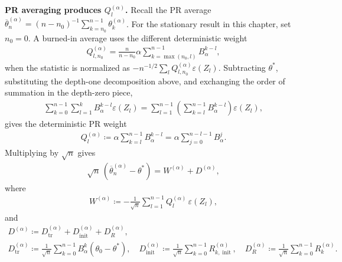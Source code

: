 \textbf{PR averaging produces \(Q_l^{(\alpha)}\).} Recall the PR average
\(\overline{\theta}_n^{(\alpha)} = (n - n_0)^{-1} \sum_{k = n_0}^{n - 1} \theta_k^{(\alpha)}\).
For the stationary result in this chapter, set \(n_0 = 0\). A burned-in average
uses the different deterministic weight
\begin{equation}
\begin{aligned}
Q_{l,n_0}^{(\alpha)}
  = \frac{n}{n - n_0} \alpha \sum_{k = \max(n_0, l)}^{n - 1}
      B_\alpha^{k - l},
\end{aligned}
\end{equation}
when the statistic is normalized as
\(- n^{-1 / 2} \sum_l Q_{l,n_0}^{(\alpha)} \varepsilon(Z_l)\).
Subtracting \(\theta^*\), substituting the depth-one decomposition above, and
exchanging the order of summation in the depth-zero piece,
\begin{equation}
\begin{aligned}
\sum_{k = 0}^{n - 1} \sum_{l = 1}^k B_\alpha^{k - l} \varepsilon(Z_l)
  = \sum_{l = 1}^{n - 1}
      \left(\sum_{k = l}^{n - 1} B_\alpha^{k - l}\right)
      \varepsilon(Z_l),
\end{aligned}
\end{equation}
gives the deterministic PR weight
\begin{equation}
\begin{aligned}
Q_l^{(\alpha)}
  \coloneqq \alpha \sum_{k = l}^{n - 1} B_\alpha^{k - l}
   = \alpha \sum_{j = 0}^{n - l - 1} B_\alpha^j.
\end{aligned}
\label{eq:Q-definition}
\end{equation}
Multiplying by \(\sqrt{n}\) gives
\begin{equation}
\begin{aligned}
\sqrt{n} \, (\overline{\theta}_n^{(\alpha)} - \theta^*) = W^{(\alpha)} + D^{(\alpha)},
\end{aligned}
\end{equation}
where
\begin{equation}
\begin{aligned}
W^{(\alpha)} \coloneqq -\frac{1}{\sqrt{n}} \sum_{l = 1}^{n - 1} Q_l^{(\alpha)} \, \varepsilon(Z_l),
\end{aligned}
\label{eq:W-alpha}
\end{equation}
and
\begin{equation}
\begin{aligned}
D^{(\alpha)}
  \coloneqq D_{\operatorname{tr}}^{(\alpha)}
     + D_{\operatorname{init}}^{(\alpha)}
     + D_R^{(\alpha)},
\quad \\
D_{\operatorname{tr}}^{(\alpha)}
  \coloneqq \frac{1}{\sqrt{n}} \sum_{k = 0}^{n - 1} B_\alpha^k (\theta_0 - \theta^*),
\quad
D_{\operatorname{init}}^{(\alpha)}
  \coloneqq \frac{1}{\sqrt{n}} \sum_{k = 0}^{n - 1}
      R_{k, \operatorname{init}}^{(\alpha)},
\quad
D_R^{(\alpha)}
  \coloneqq \frac{1}{\sqrt{n}} \sum_{k = 0}^{n - 1} R_k^{(\alpha)}.
\end{aligned}
\end{equation}
